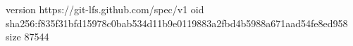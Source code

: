 version https://git-lfs.github.com/spec/v1
oid sha256:f835f31bfd15978c0bab534d11b9e0119883a2fbd4b5988a671aad54fe8ed958
size 87544
